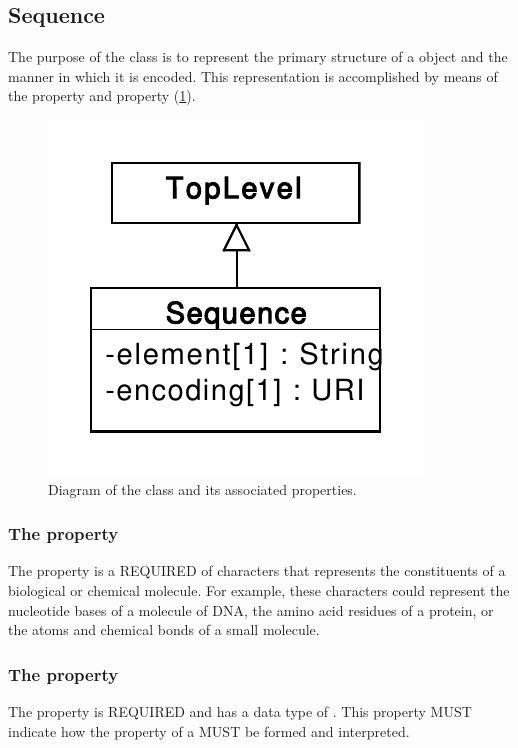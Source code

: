 \subsection{Sequence}
\label{sec:Sequence}
The purpose of the  class is to represent the primary structure of a  object and the manner in which it is encoded. This representation is accomplished  by means of the  property and  property (\ref{uml:sequence}).

\begin{figure}[ht]
\begin{center}
\includegraphics[scale=0.6]{uml/sequence}
\caption[]{Diagram of the  class and its associated properties.}
\label{uml:sequence}
\end{center}
\end{figure}


\subsubsection*{The  property}
\label{sec:elements}
The  property is a REQUIRED  of characters that represents the constituents of a biological or chemical molecule. For example, these characters could represent the nucleotide bases of a molecule of DNA, the amino acid residues of a protein, or the atoms and chemical bonds of a small molecule.

\subsubsection*{The  property}
\label{sec:encoding}
The  property is REQUIRED and has a data type of . This property MUST indicate how the  property of a  MUST be formed and interpreted.

